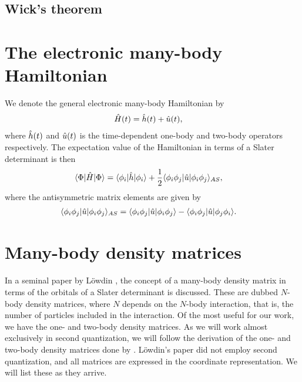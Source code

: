         \subsection{Wick's theorem}

    \section{The electronic many-body Hamiltonian}
        We denote the general electronic many-body Hamiltonian by
        \begin{align}
            \hat{H}(t) &= \hat{h}(t) + \hat{u}(t),
        \end{align}
        where $\hat{h}(t)$ and $\hat{u}(t)$ is the time-dependent one-body
        and two-body operators respectively.
        The expectation value of the Hamiltonian in terms of a Slater
        determinant is then
        \begin{align}
            \langle \Phi |\hat{H}| \Phi \rangle
            &= \langle \phi_i |\hat{h}| \phi_i \rangle
            + \frac{1}{2}\langle \phi_i\phi_j |\hat{u}| \phi_i\phi_j \rangle_{AS},
        \end{align}
        where the antisymmetric matrix elements are given by
        \begin{align}
            \langle \phi_i\phi_j |\hat{u}| \phi_i\phi_j \rangle_{AS}
            &= \langle \phi_i\phi_j |\hat{u}| \phi_i\phi_j \rangle
            - \langle \phi_i\phi_j |\hat{u}| \phi_j\phi_i \rangle.
            \label{eq:antisymmetric_two_body}
        \end{align}

    \section{Many-body density matrices}
        In a seminal paper by Löwdin \cite{lowdin-density-matrices}, the
        concept of a many-body density matrix in terms of the orbitals of a
        Slater determinant is discussed. These are dubbed $N$-body density
        matrices, where $N$ depends on the $N$-body interaction, that is,
        the number of particles included in the interaction. Of the most
        useful for our work, we have the one- and two-body density matrices.
        As we will work almost exclusively in second quantization, we will
        follow the derivation of the one- and two-body density matrices done
        by \citeauthor{helgaker-molecular}. Löwdin's paper
        \cite{lowdin-density-matrices} did not employ second quantization,
        and all matrices are expressed in the coordinate representation. We
        will list these as they arrive.
